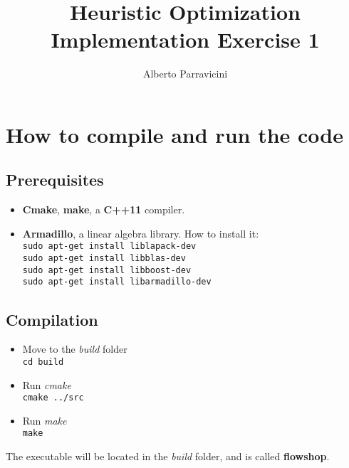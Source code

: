 \documentclass[
12pt,
a4paper,
oneside,
headinclude,
footinclude]{article}
\title{\textbf{Heuristic Optimization \\ Implementation Exercise 1}}
\author{{Alberto Parravicini}}
\date{}	%
\theoremstyle{definition} %
\begin{document}
\maketitle
{}
\setcounter{page}{1}






\section{How to compile and run the code}
\subsection{\textbf{Prerequisites}}
\begin{itemize}
    \item \textbf{Cmake}, \textbf{make}, a \textbf{C++11} compiler.
    \item \textbf{Armadillo}, a linear algebra library. How to install it:\\
        \-\quad\texttt{sudo apt-get install liblapack-dev}\\
        \-\quad\texttt{sudo apt-get install libblas-dev}\\
        \-\quad\texttt{sudo apt-get install libboost-dev}\\
        
        \quad\texttt{sudo apt-get install libarmadillo-dev}
\end{itemize}
\subsection{\textbf{Compilation}}
\begin{itemize}
   \item Move to the \textit{build} folder\\
    \-\quad\texttt{cd build}
   \item Run \textit{cmake}\\
    \-\quad\texttt{cmake ../src}
   \item Run \textit{make}\\
    \-\quad\texttt{make}
\end{itemize}

The executable will be located in the \textit{build} folder, and is called \textbf{flowshop}.
\end{document}
